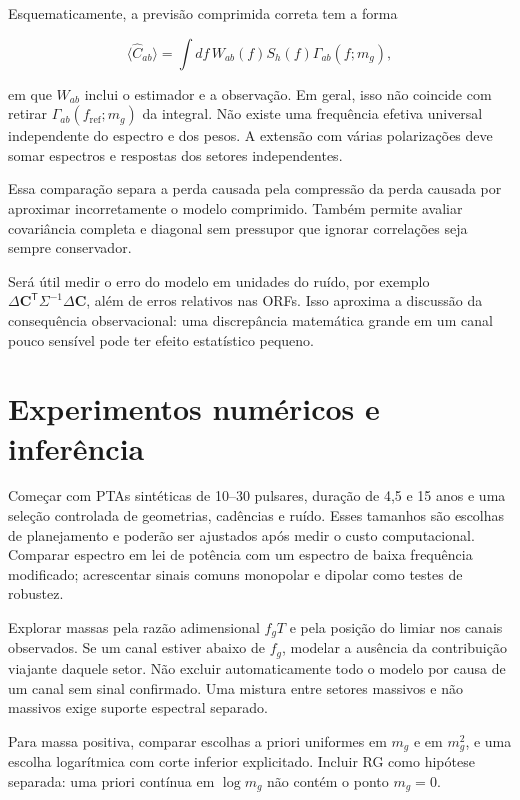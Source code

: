 Esquematicamente, a previsão comprimida correta tem a forma

\[\langle\widehat C_{ab}\rangle=\int df\,W_{ab}(f)S_h(f)\Gamma_{ab}(f;m_g),\]

em que \(W_{ab}\) inclui o estimador e a observação. Em geral, isso não
coincide com retirar \(\Gamma_{ab}(f_{\mathrm{ref}};m_g)\) da integral.
Não existe uma frequência efetiva universal independente do espectro e
dos pesos. A extensão com várias polarizações deve somar espectros e
respostas dos setores independentes.

Essa comparação separa a perda causada pela compressão da perda causada
por aproximar incorretamente o modelo comprimido. Também permite avaliar
covariância completa e diagonal sem pressupor que ignorar correlações
seja sempre conservador.

Será útil medir o erro do modelo em unidades do ruído, por exemplo
\(\Delta\mathbf C^\mathsf T\Sigma^{-1}\Delta\mathbf C\), além de erros
relativos nas ORFs. Isso aproxima a discussão da consequência
observacional: uma discrepância matemática grande em um canal pouco
sensível pode ter efeito estatístico pequeno.

\section{Experimentos numéricos e
inferência}\label{experimentos-numuxe9ricos-e-inferuxeancia}

Começar com PTAs sintéticas de 10--30 pulsares, duração de 4,5 e 15 anos
e uma seleção controlada de geometrias, cadências e ruído. Esses
tamanhos são escolhas de planejamento e poderão ser ajustados após medir
o custo computacional. Comparar espectro em lei de potência com um
espectro de baixa frequência modificado; acrescentar sinais comuns
monopolar e dipolar como testes de robustez.

Explorar massas pela razão adimensional \(f_gT\) e pela posição do
limiar nos canais observados. Se um canal estiver abaixo de \(f_g\),
modelar a ausência da contribuição viajante daquele setor. Não excluir
automaticamente todo o modelo por causa de um canal sem sinal
confirmado. Uma mistura entre setores massivos e não massivos exige
suporte espectral separado.

Para massa positiva, comparar escolhas a priori uniformes em \(m_g\) e
em \(m_g^2\), e uma escolha logarítmica com corte inferior explicitado.
Incluir RG como hipótese separada: uma priori contínua em \(\log m_g\)
não contém o ponto \(m_g=0\).

